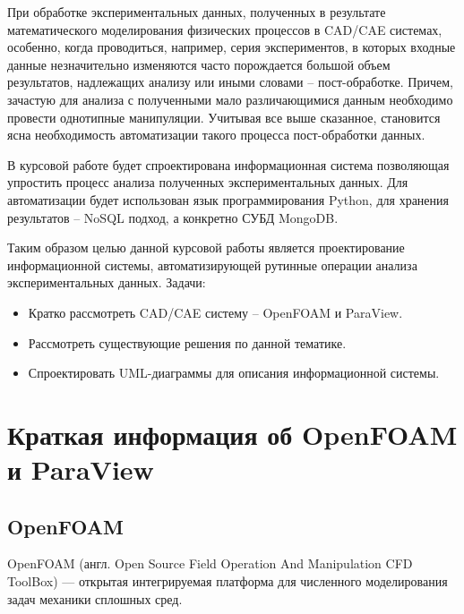 \documentclass[14pt]{extreport}
\begin{document}



\tableofcontents

\intro
При обработке экспериментальных данных, полученных в результате математического моделирования физических процессов в CAD/CAE системах, особенно, когда проводиться, например, серия экспериментов, в которых входные данные незначительно изменяются часто порождается большой объем результатов, надлежащих анализу или иными словами -- пост-обработке. Причем, зачастую для анализа с полученными мало различающимися данным необходимо провести однотипные манипуляции. Учитывая все выше сказанное, становится ясна необходимость автоматизации такого процесса пост-обработки данных. 

В курсовой работе будет спроектирована информационная система позволяющая упростить процесс анализа полученных экспериментальных данных. Для автоматизации будет использован язык программирования Python, для хранения результатов -- NoSQL подход, а конкретно СУБД MongoDB. 

Таким образом целью данной курсовой работы является проектирование информационной системы, автоматизирующей рутинные операции анализа экспериментальных данных.
Задачи:
\begin{itemize}
\item Кратко рассмотреть CAD/CAE систему -- OpenFOAM и ParaView.
\item Рассмотреть существующие решения по данной тематике.
\item Спроектировать UML-диаграммы для описания информационной системы.
\end{itemize}

\chapter{Краткая информация об OpenFOAM и ParaView}
\section{OpenFOAM}
OpenFOAM (англ. Open Source Field Operation And Manipulation CFD ToolBox) — открытая интегрируемая платформа для численного моделирования задач механики сплошных сред. ~\cite{OpenfoamWiki}
\end{document}
